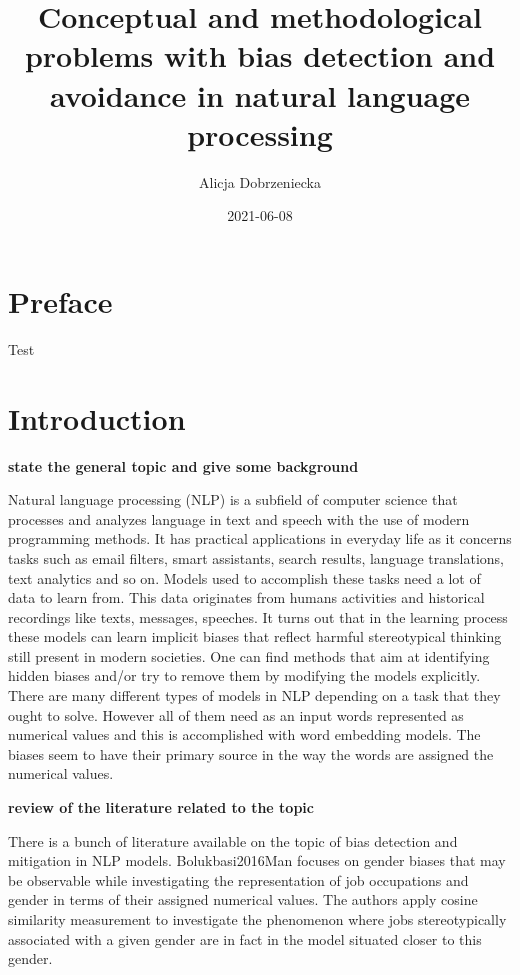 \documentclass[]{book}
\title{Conceptual and methodological problems with bias detection and avoidance
in natural language processing}
\author{Alicja Dobrzeniecka}
\date{2021-06-08}
\begin{document}
\maketitle

{
\setcounter{tocdepth}{5}
\tableofcontents
}
\chapter*{Preface}\label{preface}

Test

\chapter{Introduction}\label{introduction}

\textbf{state the general topic and give some background}

Natural language processing (NLP) is a subfield of computer science that
processes and analyzes language in text and speech with the use of
modern programming methods. It has practical applications in everyday
life as it concerns tasks such as email filters, smart assistants,
search results, language translations, text analytics and so on. Models
used to accomplish these tasks need a lot of data to learn from. This
data originates from humans activities and historical recordings like
texts, messages, speeches. It turns out that in the learning process
these models can learn implicit biases that reflect harmful
stereotypical thinking still present in modern societies. One can find
methods that aim at identifying hidden biases and/or try to remove them
by modifying the models explicitly. There are many different types of
models in NLP depending on a task that they ought to solve. However all
of them need as an input words represented as numerical values and this
is accomplished with word embedding models. The biases seem to have
their primary source in the way the words are assigned the numerical
values. \newline

\textbf{review of the literature related to the topic}

There is a bunch of literature available on the topic of bias detection
and mitigation in NLP models. Bolukbasi2016Man focuses on gender biases
that may be observable while investigating the representation of job
occupations and gender in terms of their assigned numerical values. The
authors apply cosine similarity measurement to investigate the
phenomenon where jobs stereotypically associated with a given gender are
in fact in the model situated closer to this gender.
\end{document}
